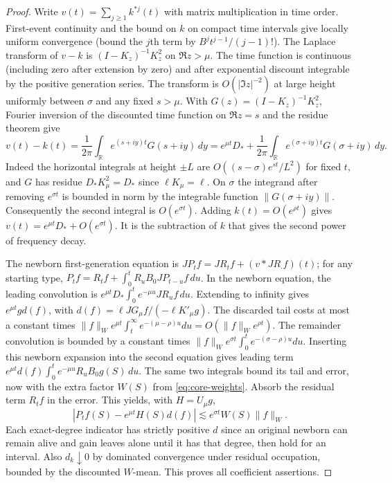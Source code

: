 \documentclass[11pt]{article}
\theoremstyle{remark}
\numberwithin{equation}{section}
\begin{document}
\begin{proof}
Write $v(t)=\sum_{j\ge1} k^{*j}(t)$ with matrix multiplication in time order. First-event continuity and the bound on $k$ on compact time intervals give locally uniform convergence (bound the $j$th term by $B^j t^{j-1}/(j-1)!$). The Laplace transform of $v-k$ is $(I-K_z)^{-1}K_z^2$ on $\Re z>\mu$. The time function is continuous (including zero after extension by zero) and after exponential discount integrable by the positive generation series. The transform is $O(|\Im z|^{-2})$ at large height uniformly between $\sigma$ and any fixed $s>\mu$. With $G(z)=(I-K_z)^{-1}K_z^2$, Fourier inversion of the discounted time function on $\Re z=s$ and the residue theorem give
\[
 v(t)-k(t)=\frac1{2\pi}\int_{\mathbb R}e^{(s+iy)t}G(s+iy)\,dy
 = e^{\mu t}D_*+\frac1{2\pi}\int_{\mathbb R}e^{(\sigma+iy)t}G(\sigma+iy)\,dy.
\]
Indeed the horizontal integrals at height $\pm L$ are $O((s-\sigma)e^{st}/L^2)$ for fixed $t$, and $G$ has residue $D_*K_\mu^2=D_*$ since $\ell K_\mu=\ell$. On $\sigma$ the integrand after removing $e^{\sigma t}$ is bounded in norm by the integrable function $\|G(\sigma+iy)\|$. Consequently the second integral is $O(e^{\sigma t})$. Adding $k(t)=O(e^{\rho t})$ gives $v(t)=e^{\mu t}D_*+O(e^{\sigma t})$. It is the subtraction of $k$ that gives the second power of frequency decay.

The newborn first-generation equation is $JP_tf=JR_tf+(v*JR_\cdot f)(t)$; for any starting type, $P_tf=R_tf+\int_0^t R_uB_0JP_{t-u}f\,du$. In the newborn equation, the leading convolution is $e^{\mu t}D_*\int_0^t e^{-\mu u}JR_u f\,du$. Extending to infinity gives $e^{\mu t}g d(f)$, with $d(f)=\ell JG_\mu f/(-\ell K'_\mu g)$. The discarded tail costs at most a constant times $\|f\|_W e^{\mu t}\int_t^\infty e^{-(\mu-\rho)u}du=O(\|f\|_W e^{\rho t})$. The remainder convolution is bounded by a constant times $\|f\|_W e^{\sigma t}\int_0^t e^{-(\sigma-\rho)u}du$. Inserting this newborn expansion into the second equation gives leading term $e^{\mu t}d(f)\int_0^t e^{-\mu u}R_u B_0g(S)\,du$. The same two integrals bound its tail and error, now with the extra factor $W(S)$ from \eqref{eq:core-weights}. Absorb the residual term $R_t f$ in the error. This yields, with $H=U_\mu g$,
\[
 |P_tf(S)-e^{\mu t}H(S)d(f)|\lesssim e^{\sigma t}W(S)\|f\|_W.
\]
Each exact-degree indicator has strictly positive $d$ since an original newborn can remain alive and gain leaves alone until it has that degree, then hold for an interval. Also $d_k\downarrow0$ by dominated convergence under residual occupation, bounded by the discounted $W$-mean. This proves all coefficient assertions.


\end{proof}
\end{document}
